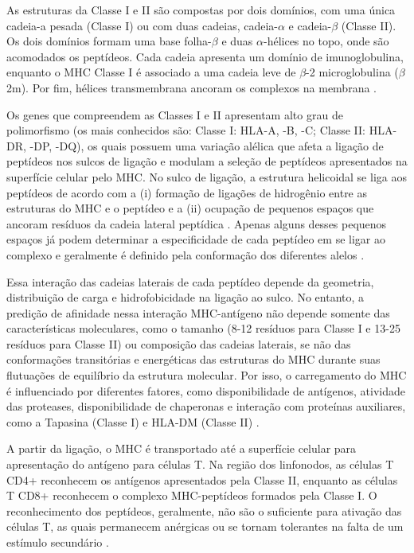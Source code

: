 \begin{justify}
As estruturas da Classe I e II são compostas por dois domínios, com uma única cadeia-a pesada (Classe I) ou com duas cadeias, cadeia-$\alpha$ e cadeia-$\beta$ (Classe II). Os dois domínios formam uma base folha-$\beta$ e duas $\alpha$-hélices no topo, onde são acomodados os peptídeos. Cada cadeia apresenta um domínio de imunoglobulina, enquanto o MHC Classe I é associado a uma cadeia leve de $\beta$-2 microglobulina ($\beta$2m). Por fim, hélices transmembrana ancoram os complexos na membrana \cite{Wieczorek:2017}.

Os genes que compreendem as Classes I e II apresentam alto grau de polimorfismo (os mais conhecidos são: Classe I: HLA-A, -B, -C; Classe II: HLA-DR, -DP, -DQ), os quais possuem uma variação alélica que afeta a ligação de peptídeos nos sulcos de ligação e modulam a seleção de peptídeos apresentados na superfície celular pelo MHC. No sulco de ligação, a estrutura helicoidal se liga aos peptídeos de acordo com a (i) formação de ligações de hidrogênio entre as estruturas do MHC e o peptídeo e a (ii) ocupação de pequenos espaços que ancoram resíduos da cadeia lateral peptídica \cite{Wieczorek:2017}. Apenas alguns desses pequenos espaços já podem determinar a especificidade de cada peptídeo em se ligar ao complexo e geralmente é definido pela conformação dos diferentes alelos \cite{Klein:2000}.

Essa interação das cadeias laterais de cada peptídeo depende da geometria, distribuição de carga e hidrofobicidade na ligação ao sulco. No entanto, a predição de afinidade nessa interação MHC-antígeno não depende somente das características moleculares, como o tamanho (8-12 resíduos para Classe I e 13-25 resíduos para Classe II) ou composição das cadeias laterais,  se não das conformações transitórias e energéticas das estruturas do MHC durante suas flutuações de equilíbrio da estrutura molecular. Por isso, o carregamento do MHC é influenciado por diferentes fatores, como disponibilidade de antígenos, atividade das proteases, disponibilidade de chaperonas e interação com proteínas auxiliares, como a Tapasina (Classe I) e HLA-DM (Classe II) \cite{Wieczorek:2017}.

A partir da ligação, o MHC é transportado até a superfície celular para apresentação do antígeno para células T. Na região dos linfonodos, as células T CD4+ reconhecem os antígenos apresentados pela Classe II, enquanto as células T CD8+ reconhecem o complexo MHC-peptídeos formados pela Classe I. O reconhecimento dos peptídeos, geralmente, não são o suficiente para ativação das células T, as quais permanecem anérgicas ou se tornam tolerantes na falta de um estímulo secundário \cite{Siegrist:2018}. 


\end{justify}
